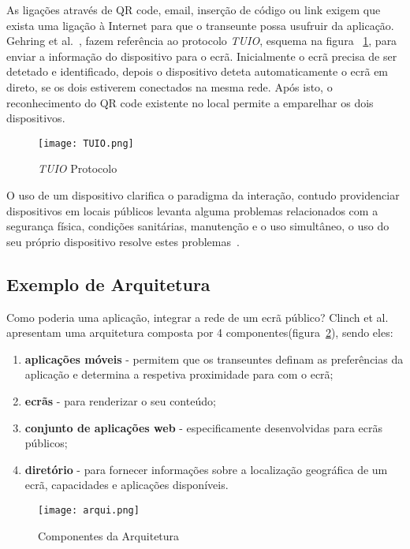 As ligações através de QR code, email, inserção de código ou link exigem que exista uma ligação à Internet para que o transeunte possa usufruir da aplicação. 
Gehring et al.~\cite{Gehring}, fazem referência ao protocolo \textit{TUIO}, esquema na figura ~\ref{fig:TUIO}, para enviar a informação do dispositivo para o ecrã. Inicialmente o ecrã precisa de ser detetado e identificado, depois o dispositivo deteta automaticamente o ecrã em direto, se os dois estiverem conectados na mesma rede. Após isto, o reconhecimento do QR code existente no local permite a emparelhar os dois dispositivos.

\begin{figure}[h]
\centering
\texttt{[image: TUIO.png]}
\caption[textit{TUIO} Protocolo] {\textit{TUIO} Protocolo ~\cite{Gehring}}
\label{fig:TUIO}
\end{figure}


O uso de um dispositivo clarifica o paradigma da interação, contudo providenciar dispositivos em locais públicos levanta alguma problemas relacionados com a segurança física, condições sanitárias, manutenção e o uso simultâneo, o uso do seu próprio dispositivo resolve estes problemas~\cite{Ballagas}.

\subsection{Exemplo de Arquitetura}

Como poderia uma aplicação, integrar a rede de um ecrã público? Clinch et al.~\cite{Clinch2012}  apresentam uma arquitetura composta por 4 componentes(figura~\ref{fig:arquitetura}), sendo eles:
\begin{enumerate}
\item \textbf{aplicações móveis} - permitem que os transeuntes definam as preferências da aplicação e determina a respetiva proximidade para com o ecrã;
\item \textbf{ecrãs} - para renderizar o seu conteúdo;
\item \textbf{conjunto de aplicações web} - especificamente desenvolvidas para ecrãs públicos;
\item \textbf{diretório} - para fornecer informações sobre a localização geográfica de um ecrã, 
capacidades e aplicações disponíveis.
\end{enumerate}

\begin{figure}[h]
\centering
\texttt{[image: arqui.png]}
\caption[Componentes da Arquitetura] {Componentes da Arquitetura~\cite{Gehring}}
\label{fig:arquitetura}
\end{figure}


